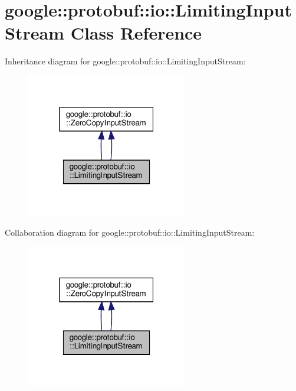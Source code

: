 \hypertarget{classgoogle_1_1protobuf_1_1io_1_1LimitingInputStream}{}\section{google\+:\+:protobuf\+:\+:io\+:\+:Limiting\+Input\+Stream Class Reference}
\label{classgoogle_1_1protobuf_1_1io_1_1LimitingInputStream}


Inheritance diagram for google\+:\+:protobuf\+:\+:io\+:\+:Limiting\+Input\+Stream\+:
\nopagebreak
\begin{figure}[H]
\begin{center}
\leavevmode
\includegraphics[width=199pt]{classgoogle_1_1protobuf_1_1io_1_1LimitingInputStream__inherit__graph}
\end{center}
\end{figure}


Collaboration diagram for google\+:\+:protobuf\+:\+:io\+:\+:Limiting\+Input\+Stream\+:
\nopagebreak
\begin{figure}[H]
\begin{center}
\leavevmode
\includegraphics[width=199pt]{classgoogle_1_1protobuf_1_1io_1_1LimitingInputStream__coll__graph}
\end{center}
\end{figure}
